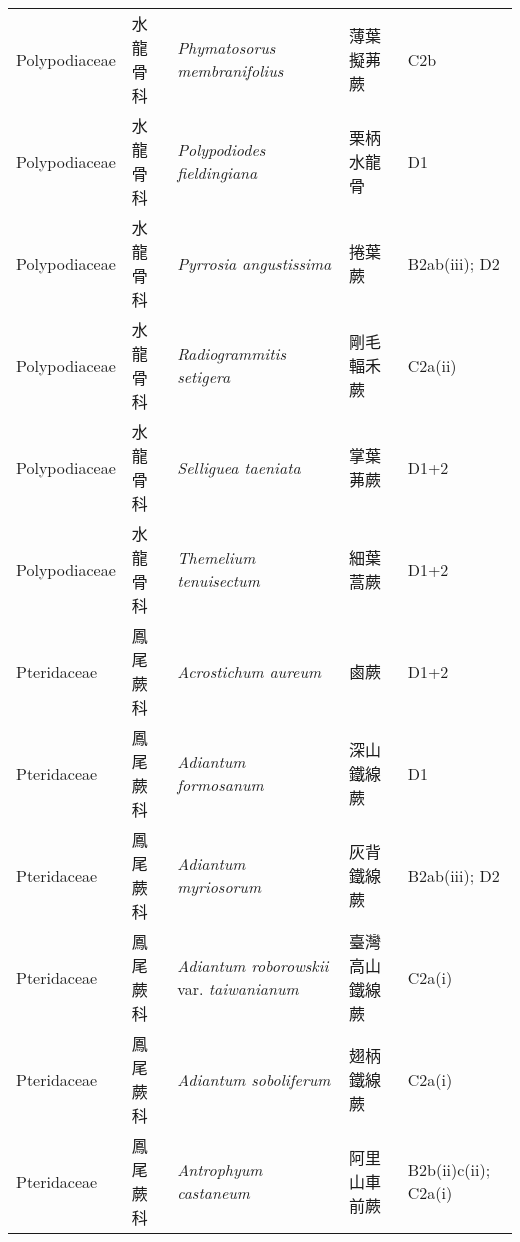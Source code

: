 {\begin{longtable}{p{2.5cm}p{2.5cm}p{4.5cm}p{2.5cm}p{3cm}}
    Polypodiaceae & 水龍骨科 & \textit{Phymatosorus membranifolius}  & 薄葉擬茀蕨 & C2b \index{Phymatosorus@\textit{Phymatosorus}!membranifolius@\textit{membranifolius}}  \index{薄葉擬茀蕨} \\
    Polypodiaceae & 水龍骨科 & \textit{Polypodiodes fieldingiana}  & 栗柄水龍骨 & D1 \index{Polypodiodes@\textit{Polypodiodes}!fieldingiana@\textit{fieldingiana}}  \index{栗柄水龍骨} \\
    Polypodiaceae & 水龍骨科 & \textit{Pyrrosia angustissima}  & 捲葉蕨 & B2ab(iii); D2 \index{Pyrrosia@\textit{Pyrrosia}!angustissima@\textit{angustissima}}  \index{捲葉蕨} \\
    Polypodiaceae & 水龍骨科 & \textit{Radiogrammitis setigera}  & 剛毛輻禾蕨 & C2a(ii) \index{Radiogrammitis@\textit{Radiogrammitis}!setigera@\textit{setigera}}  \index{剛毛輻禾蕨} \\
    Polypodiaceae & 水龍骨科 & \textit{Selliguea taeniata}  & 掌葉茀蕨 & D1+2 \index{Selliguea@\textit{Selliguea}!taeniata@\textit{taeniata}}  \index{掌葉茀蕨} \\
    Polypodiaceae & 水龍骨科 & \textit{Themelium tenuisectum}  & 細葉蒿蕨 & D1+2 \index{Themelium@\textit{Themelium}!tenuisectum@\textit{tenuisectum}}  \index{細葉蒿蕨} \\
    Pteridaceae & 鳳尾蕨科 & \textit{Acrostichum aureum}  & 鹵蕨 & D1+2 \index{Acrostichum@\textit{Acrostichum}!aureum@\textit{aureum}}  \index{鹵蕨} \\
    Pteridaceae & 鳳尾蕨科 & \textit{Adiantum formosanum}  & 深山鐵線蕨 & D1 \index{Adiantum@\textit{Adiantum}!formosanum@\textit{formosanum}}  \index{深山鐵線蕨} \\
    Pteridaceae & 鳳尾蕨科 & \textit{Adiantum myriosorum}  & 灰背鐵線蕨 & B2ab(iii); D2 \index{Adiantum@\textit{Adiantum}!myriosorum@\textit{myriosorum}}  \index{灰背鐵線蕨} \\
    Pteridaceae & 鳳尾蕨科 & \textit{Adiantum roborowskii} var. \textit{taiwanianum}  & 臺灣高山鐵線蕨 & C2a(i) \index{Adiantum@\textit{Adiantum}!roborowskii@\textit{roborowskii}!var. taiwanianum@var. \textit{taiwanianum}}  \index{臺灣高山鐵線蕨} \\
    Pteridaceae & 鳳尾蕨科 & \textit{Adiantum soboliferum}  & 翅柄鐵線蕨 & C2a(i) \index{Adiantum@\textit{Adiantum}!soboliferum@\textit{soboliferum}}  \index{翅柄鐵線蕨} \\
    Pteridaceae & 鳳尾蕨科 & \textit{Antrophyum castaneum}  & 阿里山車前蕨 & B2b(ii)c(ii); C2a(i) \index{Antrophyum@\textit{Antrophyum}!castaneum@\textit{castaneum}}  \index{阿里山車前蕨} \\

\end{longtable}}
